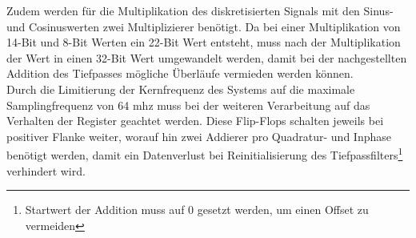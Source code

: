 Zudem werden für die Multiplikation des diskretisierten Signals mit den Sinus- und Cosinuswerten zwei Multiplizierer benötigt. Da bei einer Multiplikation von 14-Bit und 8-Bit Werten ein 22-Bit Wert entsteht, muss nach der Multiplikation der Wert in einen 32-Bit Wert umgewandelt werden, damit bei der nachgestellten Addition des Tiefpasses mögliche Überläufe vermieden werden können.\\
Durch die Limitierung der Kernfrequenz des Systems auf die maximale Samplingfrequenz von 64 \ac{mhz} muss bei der weiteren Verarbeitung auf das Verhalten der Register geachtet werden. Diese Flip-Flops schalten jeweils bei positiver Flanke weiter, worauf hin zwei Addierer pro Quadratur- und Inphase benötigt werden, damit ein Datenverlust bei Reinitialisierung des Tiefpassfilters\footnote{Startwert der Addition muss auf 0 gesetzt werden, um einen Offset zu vermeiden} verhindert wird. 
